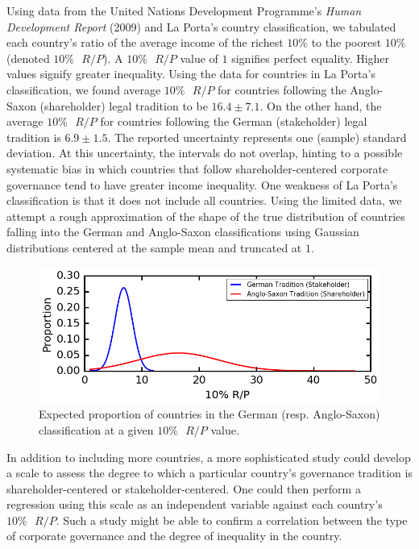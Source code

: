 \documentclass[12pt]{article}
\begin{document}
Using data from the United Nations Development Programme's \textit{Human Development Report} (2009) and La Porta's country classification, we tabulated each country's ratio of the average income of the richest $10\%$ to the poorest $10\%$ (denoted $10\% \text{ }R/P$). A $10\% \text{ } R/P$ value of $1$ signifies perfect equality. Higher values signify greater inequality. Using the data for countries in La Porta's classification, we found average $10\% \text{ }R/P$ for countries following the Anglo-Saxon (shareholder) legal tradition to be $16.4 \pm 7.1$. On the other hand, the average $10\% \text{ }R/P$ for countries following the German (stakeholder) legal tradition is $6.9 \pm 1.5$. The reported uncertainty represents one (sample) standard deviation. At this uncertainty, the intervals do not overlap, hinting to a possible systematic bias in which countries that follow shareholder-centered corporate governance tend to have greater income inequality. One weakness of La Porta's classification is that it does not include all countries. Using the limited data, we attempt a rough approximation of the shape of the true distribution of countries falling into the German and Anglo-Saxon classifications using Gaussian distributions centered at the sample mean and truncated at $1$. 
\begin{figure}[!htbp]
\begin{center}
\includegraphics[width=.90\textwidth]
{un10rp.png}
\captionsetup{justification=centering}
\caption{Expected proportion of countries in the German (resp. Anglo-Saxon) classification at a given $10\% \text{ } R/P$ value.}
\end{center}
\end{figure}

In addition to including more countries, a more sophisticated study could develop a scale to assess the degree to which a particular country's governance tradition is shareholder-centered or stakeholder-centered. One could then perform a regression using this scale as an independent variable against each country's $10\% \text{ } R/P$. Such a study might be able to confirm a correlation between the type of corporate governance and the degree of inequality in the country. 
\end{document}
